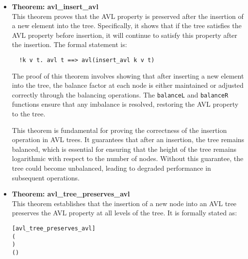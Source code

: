\documentclass[12pt]{article}
\begin{document}
\begin{itemize}
  This theorem is crucial for ensuring that the AVL tree continues to exhibit logarithmic height relative to the number of nodes, which is key to maintaining efficient search, insertion, and deletion operations.

  \item \textbf{Theorem: avl\_insert\_avl} \\
  This theorem proves that the AVL property is preserved after the insertion of a new element into the tree. Specifically, it shows that if the tree satisfies the AVL property before insertion, it will continue to satisfy this property after the insertion. The formal statement is:
  \begin{verbatim}
  !k v t. avl t ==> avl(insert_avl k v t)
  \end{verbatim}
  The proof of this theorem involves showing that after inserting a new element into the tree, the balance factor at each node is either maintained or adjusted correctly through the balancing operations. The \texttt{balanceL} and \texttt{balanceR} functions ensure that any imbalance is resolved, restoring the AVL property to the tree.

  This theorem is fundamental for proving the correctness of the insertion operation in AVL trees. It guarantees that after an insertion, the tree remains balanced, which is essential for ensuring that the height of the tree remains logarithmic with respect to the number of nodes. Without this guarantee, the tree could become unbalanced, leading to degraded performance in subsequent operations.

  \item \textbf{Theorem: avl\_tree\_preserves\_avl} \\
  This theorem establishes that the insertion of a new node into an AVL tree preserves the AVL property at all levels of the tree. It is formally stated as:

\begin{alltt}
[avl_tree_preserves_avl]
\HOLTokenTurnstile{}   \HOLSymConst{\HOLTokenConj{}}   \HOLSymConst{\HOLTokenConj{}}
   (  \HOLSymConst{=}   \HOLSymConst{\HOLTokenDisj{}}   \HOLSymConst{=}   \HOLSymConst{\ensuremath{+}}  \HOLSymConst{\HOLTokenDisj{}}
      \HOLSymConst{=}   \HOLSymConst{\ensuremath{+}} ) \HOLSymConst{\HOLTokenImp{}}
    (    )
\end{alltt}


\end{itemize}
\end{document}
